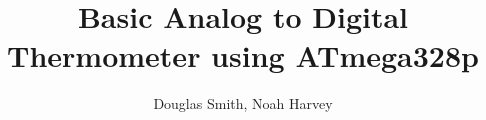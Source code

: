 \documentclass[a4paper]{report}
\begin{document}
	\title{Basic Analog to Digital Thermometer using ATmega328p}
	\author{Douglas Smith, Noah Harvey}
	\maketitle
	\tableofcontents
	
	
	
	
	
	
\end{document}
